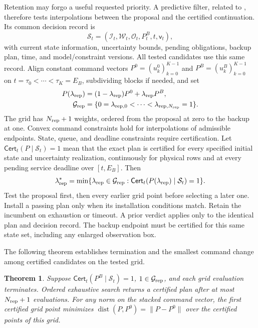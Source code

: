 \documentclass[preprint,12pt]{elsarticle}
\newtheorem{theorem}{Theorem}
\begin{document}
Retention may forgo a useful requested priority. A predictive filter,
related to \cite{wabersich2021}, therefore tests interpolations between
the proposal and the certified continuation. Its common decision record is
\[
\mathcal S_t=(\mathcal I_t,\mathcal W_t,\mathcal O_t,P_t^B,t,\mathsf v_t),
\]
with current state information, uncertainty bounds, pending obligations,
backup plan, time, and model/constraint versions. All tested candidates
use this same record. Align constant command vectors
$P^0=(u_k^0)_{k=0}^{K-1}$ and $P^B=(u_k^B)_{k=0}^{K-1}$ on
$t=\tau_0<\cdots<\tau_K=E_B$, subdividing blocks if needed, and set
\begin{equation}
\begin{aligned}
P(\lambda_{\rm rep})&=(1-\lambda_{\rm rep})P^0+\lambda_{\rm rep} P^B,\\
\mathcal G_{\rm rep}&=\{0=\lambda_{{\rm rep},0}<\cdots<\lambda_{{\rm rep},N_{\rm rep}}=1\}.
\end{aligned}
\label{eq:repair-family}
\end{equation}
The grid has $N_{\rm rep}+1$ weights, ordered from the proposal at zero
to the backup at one.
Convex command constraints hold for interpolations of admissible endpoints.
State, queue, and deadline constraints require certification.
Let $\mathsf{Cert}_t(P\mid\mathcal S_t)=1$ mean that the exact plan is certified
for every specified initial state and uncertainty realization, continuously
for physical rows and at every pending service deadline over $[t,E_B]$.
Then
\begin{equation}
\lambda_{\rm rep}^*=\min\{\lambda_{\rm rep}\in\mathcal G_{\rm rep}:
                  \mathsf{Cert}_t(P(\lambda_{\rm rep})\mid\mathcal S_t)=1\}.
\label{eq:repair-selection}
\end{equation}
Test the proposal first, then every earlier grid point before selecting
a later one. Install a passing plan only when its installation conditions
match. Retain the incumbent on exhaustion or timeout. A prior verdict
applies only to the identical plan and decision record. The backup endpoint
must be certified for this same state set, including any enlarged
observation box.

The following theorem establishes termination and the smallest command
change among certified candidates on the tested grid.

\begin{theorem}
\label{thm:repair-grid}
Suppose $\mathsf{Cert}_t(P^B\mid\mathcal S_t)=1$, $1\in\mathcal G_{\rm rep}$, and each
grid evaluation terminates. Ordered exhaustive search returns a certified
plan after at most $N_{\rm rep}+1$ evaluations. For any norm on the stacked command
vector, the first certified grid point minimizes
$\operatorname{dist}(P,P^0)=\|P-P^0\|$ over the certified points of this grid.
\end{theorem}
\end{document}
